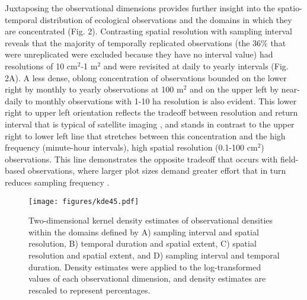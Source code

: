 \documentclass[12pt]{article}
\begin{document}
Juxtaposing the observational dimensions provides further insight into the spatio-temporal distribution of ecological observations and the domains in which they are concentrated (Fig. 2). Contrasting spatial resolution with sampling interval reveals that the majority of temporally replicated observations (the 36\% that were unreplicated were excluded because they have no interval value) had resolutions of 10 cm$^2$-1 m$^2$ and were revisited at daily to yearly intervals (Fig. 2A). A less dense, oblong concentration of observations bounded on the lower right by monthly to yearly observations at 100 m$^2$ and on the upper left by near-daily to monthly observations with 1-10 ha resolution is also evident. This lower right to upper left orientation reflects the tradeoff between resolution and return interval that is typical of satellite imaging \cite{estes_platform_2016}, and stands in contrast to the upper right to lower left line that stretches between this concentration and the high frequency (minute-hour intervals), high spatial resolution (0.1-100 cm$^2$) observations. This line demonstrates the opposite tradeoff that occurs with field-based observations, where larger plot sizes demand greater effort that in turn reduces sampling frequency \cite{kareiva_spatial_1988}.   


\begin{figure}[!ht]
\texttt{[image: figures/kde45.pdf]}
\vspace{-0.15 cm}
\caption{Two-dimensional kernel density estimates of observational densities within the domains defined by A) sampling interval and spatial resolution, B) temporal duration and spatial extent, C) spatial resolution and spatial extent, and D) sampling interval and temporal duration. Density estimates were applied to the log-transformed values of each observational dimension, and density estimates are rescaled to represent percentages. }
\label{afoto1}
\end{figure}
\end{document}
